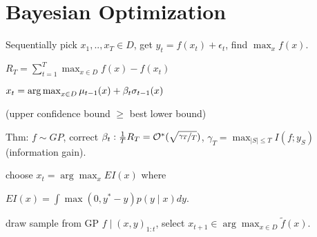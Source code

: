 
\section{Bayesian Optimization}
Sequentially pick $x_1,..,x_T \in D$, get $y_t = f(x_t) + \epsilon_t$,
find $\max_x f(x)$.

 $R_T = \sum_{t=1}^{T} \max_{x \in D} f(x) - f(x_t)$

{$x_t = \operatorname*{arg\,max}_{x \in D} \mu_{t-1}(x) + \beta_t \sigma_{t-1}(x)$}

(upper confidence bound $\geq$ best lower bound)


Thm: $f \sim GP$, correct $\beta_t:\frac{1}{T}R_T = \mathcal{O}^*(\sqrt{\nicefrac{\gamma_T}{T}})$, $\gamma_T = \max_{|S| \leq T} I(f; y_S)$ (information gain).

 choose $x_t = \arg\max_{x } EI(x)$ where

$EI(x) = \int \max(0, y^* - y) p(y \mid x) dy$.



draw sample from GP {$f \mid (x, y)_{1:t}$},
select $x_{t+1} \in \arg\max_{x \in D} \tilde{f}(x)$.
